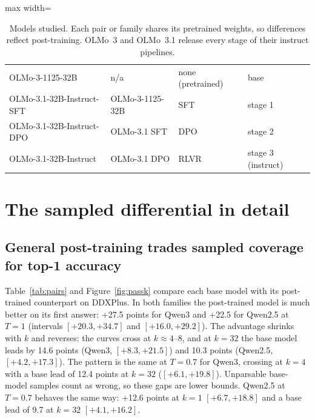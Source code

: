 \documentclass[wcp]{jmlr}
\begin{document}
\begin{table}[h]
\begin{adjustbox}{max width=\linewidth}
\begin{tabular}{llll}
\midrule
OLMo-3-1125-32B & n/a & none (pretrained) & base \\
OLMo-3.1-32B-Instruct-SFT & OLMo-3-1125-32B & SFT & stage 1 \\
OLMo-3.1-32B-Instruct-DPO & OLMo-3.1 SFT & DPO & stage 2 \\
OLMo-3.1-32B-Instruct & OLMo-3.1 DPO & RLVR & stage 3 (instruct) \\
\bottomrule
\end{tabular}
\end{adjustbox}
\caption{Models studied. Each pair or family shares its pretrained weights, so differences reflect post-training. OLMo~3 and OLMo~3.1 release every stage of their instruct pipelines.}
\label{tab:models}
\end{table}


\section{The sampled differential in detail}\label{app:sampled}
\subsection{General post-training trades sampled coverage for top-1 accuracy}\label{sec:general}
Table~\ref{tab:pairs} and Figure~\ref{fig:passk} compare each base model with its post-trained counterpart on DDXPlus.
In both families the post-trained model is much better on its first answer: +27.5 points for Qwen3 and +22.5 for Qwen2.5 at $T{=}1$ (intervals $[+20.3,+34.7]$ and $[+16.0,+29.2]$).
The advantage shrinks with $k$ and reverses: the curves cross at $k{\approx}4$--8, and at $k{=}32$ the base model leads by 14.6 points (Qwen3, $[+8.3,+21.5]$) and 10.3 points (Qwen2.5, $[+4.2,+17.3]$).
The pattern is the same at $T{=}0.7$ for Qwen3, crossing at $k{=}4$ with a base lead of 12.4 points at $k{=}32$ ($[+6.1,+19.8]$).
Unparsable base-model samples count as wrong, so these gaps are lower bounds.
Qwen2.5 at $T{=}0.7$ behaves the same way: +12.6 points at $k{=}1$ $[+6.7,+18.8]$ and a base lead of 9.7 at $k{=}32$ $[+4.1,+16.2]$.
\end{document}
